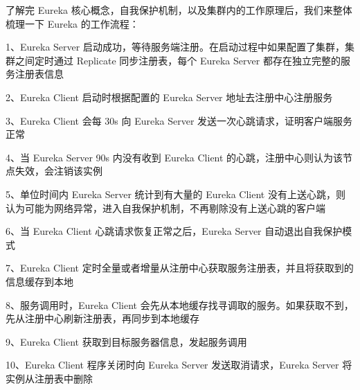 \documentclass[../../../interview-questions.tex]{subfiles}
\begin{document}
了解完 Eureka 核心概念，自我保护机制，以及集群内的工作原理后，我们来整体梳理一下 Eureka 的工作流程：

1、Eureka Server 启动成功，等待服务端注册。在启动过程中如果配置了集群，集群之间定时通过 Replicate 同步注册表，每个 Eureka Server 都存在独立完整的服务注册表信息

2、Eureka Client 启动时根据配置的 Eureka Server 地址去注册中心注册服务

3、Eureka Client 会每 30s 向 Eureka Server 发送一次心跳请求，证明客户端服务正常

4、当 Eureka Server 90s 内没有收到 Eureka Client 的心跳，注册中心则认为该节点失效，会注销该实例

5、单位时间内 Eureka Server 统计到有大量的 Eureka Client 没有上送心跳，则认为可能为网络异常，进入自我保护机制，不再剔除没有上送心跳的客户端

6、当 Eureka Client 心跳请求恢复正常之后，Eureka Server 自动退出自我保护模式

7、Eureka Client 定时全量或者增量从注册中心获取服务注册表，并且将获取到的信息缓存到本地

8、服务调用时，Eureka Client 会先从本地缓存找寻调取的服务。如果获取不到，先从注册中心刷新注册表，再同步到本地缓存

9、Eureka Client 获取到目标服务器信息，发起服务调用

10、Eureka Client 程序关闭时向 Eureka Server 发送取消请求，Eureka Server 将实例从注册表中删除
\end{document}
